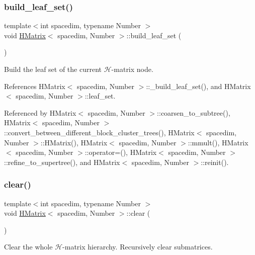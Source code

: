 \mbox{\label{classHMatrix_a139f32982527ba981e0211b5663e3b43}} 
\subsubsection{\texorpdfstring{build\+\_\+leaf\+\_\+set()}{build\_leaf\_set()}}
{\footnotesize\ttfamily template$<$int spacedim, typename Number $>$ \\
void \hyperlink{classHMatrix}{H\+Matrix}$<$ spacedim, Number $>$\+::build\+\_\+leaf\+\_\+set (\begin{DoxyParamCaption}{ }\end{DoxyParamCaption})}

Build the leaf set of the current $\mathcal{H}$-\/matrix node. 

References H\+Matrix$<$ spacedim, Number $>$\+::\+\_\+build\+\_\+leaf\+\_\+set(), and H\+Matrix$<$ spacedim, Number $>$\+::leaf\+\_\+set.



Referenced by H\+Matrix$<$ spacedim, Number $>$\+::coarsen\+\_\+to\+\_\+subtree(), H\+Matrix$<$ spacedim, Number $>$\+::convert\+\_\+between\+\_\+different\+\_\+block\+\_\+cluster\+\_\+trees(), H\+Matrix$<$ spacedim, Number $>$\+::\+H\+Matrix(), H\+Matrix$<$ spacedim, Number $>$\+::mmult(), H\+Matrix$<$ spacedim, Number $>$\+::operator=(), H\+Matrix$<$ spacedim, Number $>$\+::refine\+\_\+to\+\_\+supertree(), and H\+Matrix$<$ spacedim, Number $>$\+::reinit().

\mbox{\label{classHMatrix_ae55bd45587b895bfdb977e7cbea46519}} 
\subsubsection{\texorpdfstring{clear()}{clear()}}
{\footnotesize\ttfamily template$<$int spacedim, typename Number $>$ \\
void \hyperlink{classHMatrix}{H\+Matrix}$<$ spacedim, Number $>$\+::clear (\begin{DoxyParamCaption}{ }\end{DoxyParamCaption})}

Clear the whole $\mathcal{H}$-\/matrix hierarchy. Recursively clear submatrices.

